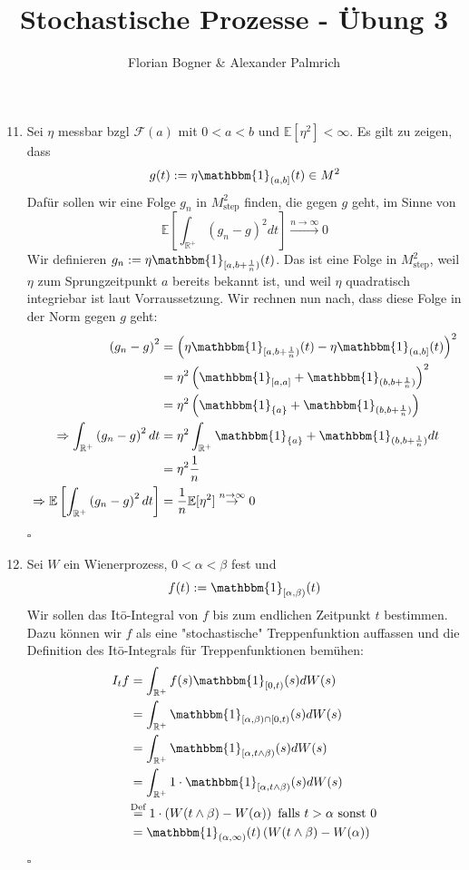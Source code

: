 \documentclass[a4paper,11pt,notitlepage,fullpage]{article}
\newcommand{\E}{\mathbb E}
\newcommand{\ind}{\mathbbm{1}}
\begin{document}
\author{Florian Bogner \& Alexander Palmrich}
\title{Stochastische Prozesse - Übung 3}
\maketitle

\begin{enumerate}
\setcounter{enumi}{10}

\item Sei $\eta$ messbar bzgl $\mathcal{F}(a)$ mit $0<a<b$ und $\E[\eta^2]<\infty$.
Es gilt zu zeigen, dass
$$g(t):=\eta \ind_{(a,b]}(t) \in M^2$$
Dafür sollen wir eine Folge $g_n$ in $M^2_\text{step}$ finden, die gegen $g$ geht, im Sinne von
$$\E\left[\int_{\mathbb{R}^+} (g_n-g)^2 dt\right] \stackrel{n\rightarrow\infty}{\rightarrow} 0$$
Wir definieren $g_n := \eta \ind_{[a,b+\frac{1}{n})}(t)$. Das ist eine Folge in $M^2_\text{step}$, weil $\eta$ zum Sprungzeitpunkt $a$ bereits bekannt ist, und weil $\eta$ quadratisch integriebar ist laut Vorraussetzung. Wir rechnen nun nach, dass diese  Folge in der Norm gegen $g$ geht:
\begin{align*}
\left(g_n-g\right)^2 &= \left(\eta \ind_{[a,b+\frac{1}{n})}(t) - \eta \ind_{(a,b]}(t) \right)^2\\
&= \eta^2 \left(\ind_{[a,a]} + \ind_{(b,b+\frac{1}{n})}\right)^2\\
&= \eta^2 \left(\ind_{\{a\}} + \ind_{(b,b+\frac{1}{n})}\right)\\
\Rightarrow \int_{\mathbb{R}^+} \left(g_n-g\right)^2 dt &= \eta^2 \int_{\mathbb{R}^+}\ind_{\{a\}} + \ind_{(b,b+\frac{1}{n})} dt\\
&= \eta^2 \frac{1}{n}\\
\Rightarrow \E \left[\int_{\mathbb{R}^+} \left(g_n-g\right)^2 dt\right] &= \frac{1}{n}\E[\eta^2] \stackrel{n\rightarrow\infty}{\rightarrow} 0
\end{align*}
\hfill $\square$

\item \label{12}Sei $W$ ein Wienerprozess, $0<\alpha <\beta$ fest und
$$f(t):= \ind_{[\alpha, \beta)}(t)$$
Wir sollen das Itō-Integral von $f$ bis zum endlichen Zeitpunkt $t$ bestimmen.
Dazu können wir $f$ als eine "stochastische" Treppenfunktion auffassen und die Definition des Itō-Integrals für Treppenfunktionen bemühen:
\begin{align*}
I_t f &= \int_{\mathbb{R}^+} f(s) \ind_{[0,t)}(s) dW(s)\\
&= \int_{\mathbb{R}^+} \ind_{[\alpha, \beta) \cap [0,t)}(s) dW(s)\\
&= \int_{\mathbb{R}^+} \ind_{[\alpha, t\wedge\beta)}(s) dW(s)\\
&= \int_{\mathbb{R}^+} 1\cdot \ind_{[\alpha, t\wedge\beta)}(s) dW(s)\\
&\hspace{-0.2em}\stackrel{\text{Def}}{=} 1\cdot \left( W(t\wedge\beta) - W(\alpha) \right) \text{ falls } t>\alpha \text{ sonst } 0\\
&= \ind_{(\alpha, \infty)}(t) \left( W(t\wedge\beta) - W(\alpha) \right)
\end{align*}
\hfill $\square$


\end{enumerate}
\end{document}
